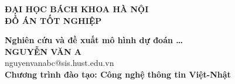 \documentclass[DoAn.tex]{subfiles}
\begin{document}
\begin{titlepage}
\thispagestyle{empty}
\begin{center}

{\textbf{\large{ĐẠI HỌC BÁCH KHOA HÀ NỘI}}}\\[4cm]

{\textbf{\huge{ ĐỒ ÁN TỐT NGHIỆP}}}\\[1cm]
{\textbf{\Large{Nghiên cứu và đề xuất mô hình dự đoán \ldots}}\\[1cm]

{\textbf{\large{NGUYỄN VĂN A}}}\\
{\large{nguyenvanabc@sis.hust.edu.vn}}\\[0.5cm]

{\textbf{\large{Chương trình đào tạo: Công nghệ thông tin Việt-Nhật
}}}\\

\vspace{4cm}
\begin{table}[H]
\centering
{}
\end{table}}
\end{center}



\end{titlepage}
\end{document}
